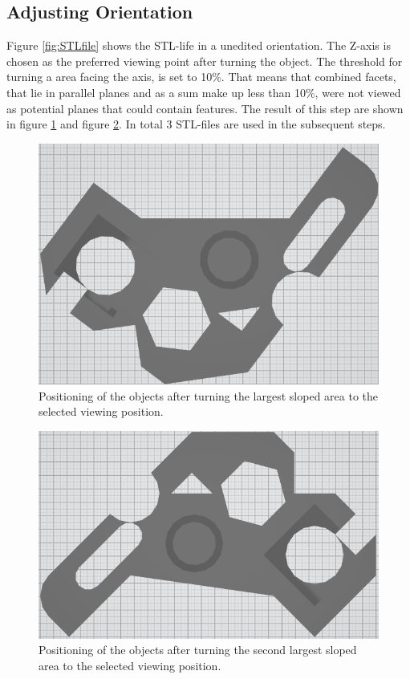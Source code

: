 \documentclass[conference]{IEEEtran}
\begin{document}
\subsection{Adjusting Orientation} 
Figure \ref{fig:STLfile} shows the STL-life in a unedited orientation. The Z-axis is chosen as the preferred viewing point after turning the object. The threshold for turning a area facing the axis, is set to 10\%. That means that combined facets, that lie in parallel planes and as a sum make up less than 10\%, were not viewed as potential planes that could contain features. The result of this step are shown in figure \ref{fig:TURNED1} and figure \ref{fig:TURNED2}. In total 3 STL-files are used in the subsequent steps.
\begin{figure}[H]
	\begin{center}
		\includegraphics[width=0.6\linewidth]{pictures/TURN1.png}
		\caption{Positioning of the objects after turning the largest sloped area to the selected viewing position.}
		\label{fig:TURNED1}
	\end{center}	
\end{figure} 
\begin{figure}[H]
	\begin{center}
		\includegraphics[width=0.6\linewidth]{pictures/TURN2.png}
		\caption{Positioning of the objects after turning the second largest sloped area to the selected viewing position.}
		\label{fig:TURNED2}
	\end{center}	
\end{figure} 
\end{document}
